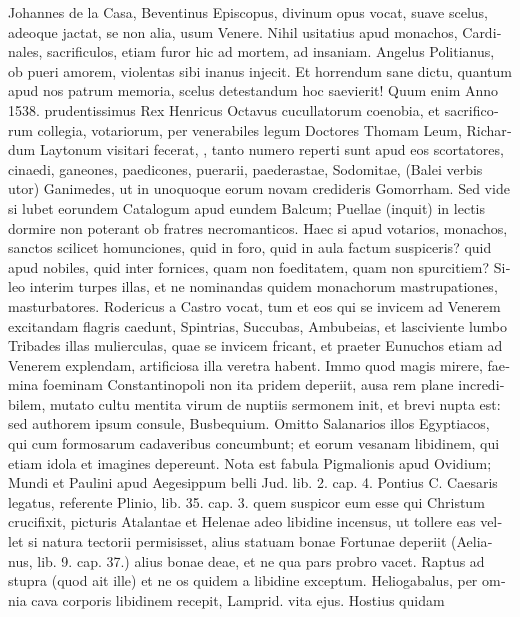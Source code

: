 \begin{latin}
Johannes de la Casa, Beventinus Episcopus, divinum opus vocat, suave
scelus, adeoque jactat, se non alia, usum Venere. Nihil usitatius apud
monachos, Cardinales, sacrificulos, etiam furor hic ad mortem, ad
insaniam. Angelus Politianus, ob pueri amorem, violentas sibi
inanus injecit. Et horrendum sane dictu, quantum apud nos patrum
memoria, scelus detestandum hoc saevierit! Quum enim Anno 1538.
prudentissimus Rex Henricus Octavus cucullatorum coenobia, et
sacrificorum collegia, votariorum, per venerabiles legum Doctores
Thomam Leum, Richardum Laytonum visitari fecerat, \etc{}, tanto numero
reperti sunt apud eos scortatores, cinaedi, ganeones, paedicones,
puerarii, paederastae, Sodomitae, (Balei verbis utor) Ganimedes,
\etc{} ut in unoquoque eorum novam credideris Gomorrham. Sed vide si lubet
eorundem Catalogum apud eundem Balcum; Puellae (inquit) in lectis
dormire non poterant ob fratres necromanticos. Haec si apud votarios,
monachos, sanctos scilicet homunciones, quid in foro, quid in aula
factum suspiceris? quid apud nobiles, quid inter fornices, quam non
foeditatem, quam non spurcitiem? Sileo interim turpes illas, et ne
nominandas quidem monachorum  mastrupationes, masturbatores.
Rodericus a Castro vocat, tum et eos qui se invicem ad Venerem
excitandam flagris caedunt, Spintrias, Succubas, Ambubeias, et
lasciviente lumbo Tribades illas mulierculas, quae se invicem fricant,
et praeter Eunuchos etiam ad Venerem explendam, artificiosa illa
veretra habent. Immo quod magis mirere, faemina foeminam
Constantinopoli non ita pridem deperiit, ausa rem plane incredibilem,
mutato cultu mentita virum de nuptiis sermonem init, et brevi nupta
est: sed authorem ipsum consule, Busbequium. Omitto Salanarios
illos Egyptiacos, qui cum formosarum cadaveribus concumbunt; et eorum
vesanam libidinem, qui etiam idola et imagines depereunt. Nota est
fabula Pigmalionis apud Ovidium; Mundi et Paulini apud Aegesippum
belli Jud. lib. 2. cap. 4. Pontius C. Caesaris legatus, referente
Plinio, lib. 35. cap. 3. quem suspicor eum esse qui Christum
crucifixit, picturis Atalantae et Helenae adeo libidine incensus, ut
tollere eas vellet si natura tectorii permisisset, alius statuam bonae
Fortunae deperiit (Aelianus, lib. 9. cap. 37.) alius bonae deae, et ne
qua pars probro vacet. Raptus ad stupra (quod ait ille) et ne
os quidem a libidine exceptum. Heliogabalus, per omnia cava
corporis libidinem recepit, Lamprid. vita ejus. Hostius quidam

\end{latin}
